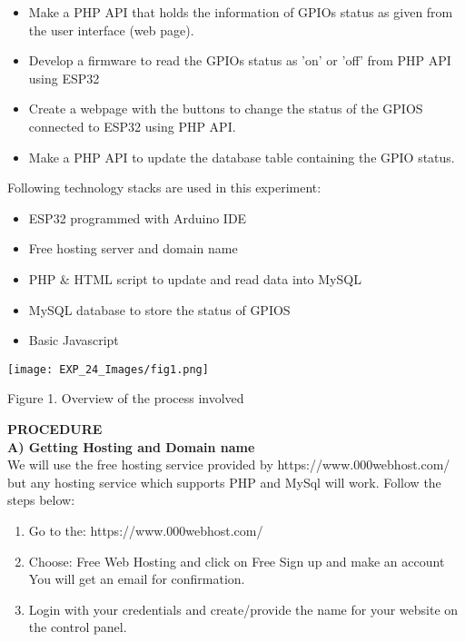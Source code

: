 \documentclass[12pt,a4paper]{article}
\begin{document}
\begin{justify}
\vspace{-3mm}
\begin{itemize}
\setlength\itemsep{-0.3em}
\item Make a PHP API that holds the information of GPIOs status as given from the user interface (web page).
\item Develop  a firmware to read the GPIOs status as 'on' or 'off' from  PHP API using ESP32
\item Create a webpage with the buttons to change the status of the GPIOS connected to ESP32 using PHP API.
\item Make a PHP API to update the database table containing the GPIO status.
\end{itemize}
Following technology stacks are used in this experiment:
\vspace{-3mm}
\begin{itemize}
\setlength\itemsep{-0.3em}
\item ESP32 programmed with Arduino IDE
\item Free hosting server and domain name
\item PHP \& HTML script to update and read  data into MySQL 
\item MySQL database to store the status of GPIOS
\item Basic Javascript
\end{itemize}
\begin{center} 
\texttt{[image: EXP\_24\_Images/fig1.png]}
\end{center}
\begin{center} {Figure 1. Overview of the process involved}\end{center}

\vspace{6pt}
\noindent \textbf{\large PROCEDURE}\\[6pt]
\textbf{A) Getting Hosting and Domain name}\\[3pt]
We will use the free hosting service provided by https://www.000webhost.com/  but any hosting service which supports PHP and MySql will work. Follow the steps below:
\vspace{-3mm}
\begin{enumerate}
\setlength\itemsep{-0.3em}
\item Go to the: https://www.000webhost.com/
\item Choose: Free Web Hosting and click on Free Sign up and make an account\\
You will get an email for confirmation.
\item Login with your credentials and create/provide the name for your website on the control panel.
\end{enumerate}


\end{justify}
\end{document}
